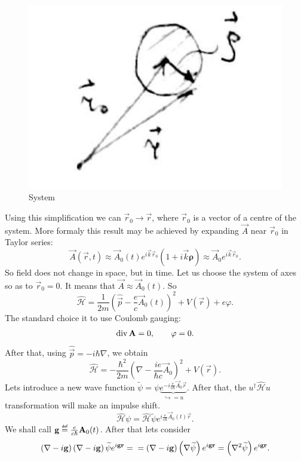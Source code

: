 \begin{figure}[h!]
	\centering
	\includegraphics[width=0.4\linewidth]{fig/L4/simply}
	\caption{System}
	\label{fig:simply}
\end{figure}


Using this simplification we can $\vec{r}_0 \to \vec{r}$, where $\vec{r}_0$ is a vector of a centre of the system. More formaly this result may be achieved by expanding $\vec{A}$ near $\vec{r}_0$ in Taylor series:
\begin{equation}
	\vec{A} (\vec{r},t) \approx \vec{A}_0 (t) e^{i \vec{k} \vec{r}_0} \left( 1 + i \vec{k} \bm{\rho} \right) \approx \vec{A}_0 e^{i \vec{k} \vec{r}_0}.
\end{equation} 
So field does not change in space, but in time. Let us choose the system of axes so as to $\vec{r}_0 = 0$. It means that $\vec{A} \approx \vec{A}_0 (t)$. So
\begin{equation}
	\hat{\mathscr{H}} = \frac{1}{2m} \left( \hat{\vec{p}}  - \frac{e}{c} \vec{A}_0(t) \right)^2 + V (\vec{r}) + e \varphi.
\end{equation}
The standard choice it to use Coulomb gauging:
\begin{equation}
	\Div \vec{A} = 0, \qquad \varphi = 0.
\end{equation}
After that, using $\hat{\vec{p}} = -i \hbar \nabla$, we obtain
\begin{equation}
	\hat{\mathscr{H}} = - \frac{\hbar^2}{2m} \left( \nabla - \frac{i e}{\hbar c} \vec{A}_0  \right)^2 + V(\vec{r}).
\end{equation}
Lets introduce a new wave function $\widetilde{\psi} = \psi \underbrace{e^{- i \frac{e}{c \hbar} \vec{A}_0 \vec{r}}}_{\hookrightarrow = u}$. After that, the $ u^{\dagger} \hat{\mathscr{H}} u $ transformation will make an impulse shift.
\begin{equation}
	\hat{\mathscr{H}} \psi = \hat{\mathscr{H}} \widetilde{\psi} e^{i \frac{e}{c \hbar} \vec{A}_0 (t) \vec{r}}.
\end{equation}
We shall call $\vec{g} \myeq \frac{e}{c \hbar} \vec{A}_0 (t)$. After that lets consider
\begin{equation}
	\left( \nabla - i \vec{g} \right) \left( \nabla - i \vec{g} \right) \widetilde{\psi} e^{i \vec{g} \vec{r}} = \\ = \left( \nabla - i \vec{g} \right) \left( \nabla \widetilde{\psi}  \right) e^{i \vec{g} \vec{r}} = \left( \nabla^2 \widetilde{\psi} \right) e^{i \vec{g} \vec{r}}.
\end{equation}
